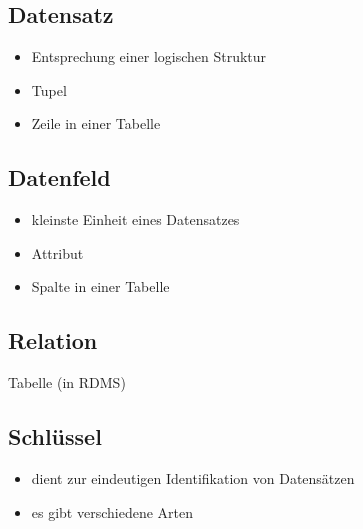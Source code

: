 \documentclass[12pt,a4paper]{report}
\begin{document}
\begin{onehalfspace}
\subsection{Datensatz}
\begin{itemize}
\item Entsprechung einer logischen Struktur
\item Tupel
\item Zeile in einer Tabelle
\end{itemize}
\subsection{Datenfeld}
\begin{itemize}
\item kleinste Einheit eines Datensatzes
\item Attribut
\item Spalte in einer Tabelle
\end{itemize}
\subsection{Relation}
Tabelle (in RDMS)
\subsection{Schlüssel}
\begin{itemize}
\item dient zur eindeutigen Identifikation von Datensätzen
\item es gibt verschiedene Arten
\end{itemize}

\end{onehalfspace}
\end{document}
